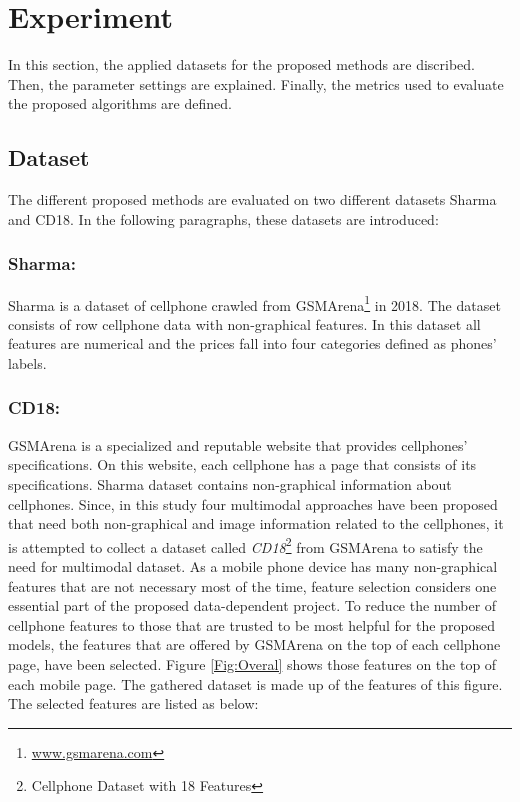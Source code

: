 \documentclass{svjour3}                     \smartqed  \usepackage{graphicx}
\begin{document}
\section{Experiment} \label{Sec:Experiments}
In this section, the applied datasets for the proposed methods are discribed. Then, the parameter settings are explained. Finally, the metrics used to evaluate the proposed algorithms are defined.

\subsection{Dataset} \label{Subsuc:Dataset}
The different proposed methods are evaluated on two different datasets Sharma and CD18. In the following paragraphs, these datasets are introduced:

\subsubsection*{\textbf{Sharma}:} Sharma \cite{Sharma}  is a dataset of cellphone crawled from GSMArena\footnote{\url{www.gsmarena.com}} in 2018. The dataset consists of  row cellphone data with  non-graphical features. In this dataset all features are numerical and  the prices fall into four categories defined as phones' labels.

\subsubsection*{\textbf{CD18}:} GSMArena is a specialized and reputable website that provides cellphones' specifications. On this website, each cellphone has a page that consists of its specifications.
Sharma dataset contains non-graphical information about cellphones. Since, in this study four multimodal approaches have been proposed that need both non-graphical and image information related to the cellphones, it is attempted to collect a dataset called \textit{CD18}\footnote{Cellphone Dataset with 18 Features} from GSMArena to satisfy the need for multimodal dataset. As a mobile phone device has many non-graphical features that are not necessary most of the time, feature selection considers one essential part of the proposed data-dependent project. To reduce the number of cellphone features to those that are trusted to be most helpful for the proposed models, the features that are offered by GSMArena on the top of each cellphone page, have been selected. Figure \ref{Fig:Overal} shows those features on the top of each mobile page. The gathered dataset is made up of the features of this figure. The selected features are listed as below:
\end{document}
